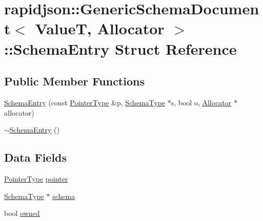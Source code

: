 \hypertarget{structrapidjson_1_1_generic_schema_document_1_1_schema_entry}{}\section{rapidjson\+::Generic\+Schema\+Document$<$ ValueT, Allocator $>$\+::Schema\+Entry Struct Reference}
\label{structrapidjson_1_1_generic_schema_document_1_1_schema_entry}
\subsection*{Public Member Functions}
\begin{DoxyCompactItemize}
\item 
\mbox{\hyperlink{structrapidjson_1_1_generic_schema_document_1_1_schema_entry_a97de9b1666b612f7aa33fe8d2848d199}{Schema\+Entry}} (const \mbox{\hyperlink{classrapidjson_1_1_generic_schema_document_a61540c0f8aa542760ae03257a0e6dab7}{Pointer\+Type}} \&p, \mbox{\hyperlink{classrapidjson_1_1_generic_schema_document_aaf4e7f371de938025f7ed4be3b83266e}{Schema\+Type}} $\ast$s, bool o, \mbox{\hyperlink{classrapidjson_1_1_allocator}{Allocator}} $\ast$allocator)
\item 
\mbox{\hyperlink{structrapidjson_1_1_generic_schema_document_1_1_schema_entry_a8dd5df622029ecc27350aa41612979d6}{$\sim$\+Schema\+Entry}} ()
\end{DoxyCompactItemize}
\subsection*{Data Fields}
\begin{DoxyCompactItemize}
\item 
\mbox{\hyperlink{classrapidjson_1_1_generic_schema_document_a61540c0f8aa542760ae03257a0e6dab7}{Pointer\+Type}} \mbox{\hyperlink{structrapidjson_1_1_generic_schema_document_1_1_schema_entry_a63c4437a25d87e1e4e6a015c544ac371}{pointer}}
\item 
\mbox{\hyperlink{classrapidjson_1_1_generic_schema_document_aaf4e7f371de938025f7ed4be3b83266e}{Schema\+Type}} $\ast$ \mbox{\hyperlink{structrapidjson_1_1_generic_schema_document_1_1_schema_entry_ad3abe83a2bb32f28ee99c120a0de6f39}{schema}}
\item 
bool \mbox{\hyperlink{structrapidjson_1_1_generic_schema_document_1_1_schema_entry_a483475d2ab71bcd27c51d288829971e9}{owned}}
\end{DoxyCompactItemize}


